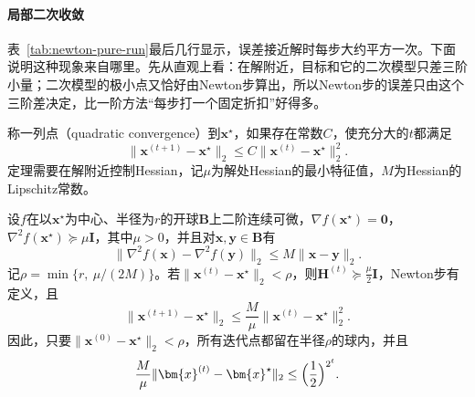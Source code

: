 \paragraph{局部二次收敛}
表~\ref{tab:newton-pure-run}最后几行显示，误差接近解时每步大约平方一次。下面说明这种现象来自哪里。先从直观上看：在解附近，目标和它的二次模型只差三阶小量；二次模型的极小点又恰好由Newton步算出，所以Newton步的误差只由这个三阶差决定，比一阶方法“每步打一个固定折扣”好得多。

称一列点（quadratic convergence）到$\bm{x}^\star$，如果存在常数$C$，使充分大的$t$都满足
\begin{equation}
 \lVert\bm{x}^{(t+1)}-\bm{x}^\star\rVert_2\leq C\lVert\bm{x}^{(t)}-\bm{x}^\star\rVert_2^2.
 \label{eq:newton-quadratic-definition}
\end{equation}
定理需要在解附近控制Hessian，记$\mu$为解处Hessian的最小特征值，$M$为Hessian的Lipschitz常数。

\begin{theorem}[Newton法的局部二次收敛]
\label{thm:newton-local}
设$f$在以$\bm{x}^\star$为中心、半径为$r$的开球$\bm{B}$上二阶连续可微，$\nabla f(\bm{x}^\star)=\bm{0}$，$\nabla^2f(\bm{x}^\star)\succeq\mu\bm{I}$，其中$\mu>0$，并且对$\bm{x},\bm{y}\in\bm{B}$有
\begin{equation}
 \lVert\nabla^2f(\bm{x})-\nabla^2f(\bm{y})\rVert_2\leq M\lVert\bm{x}-\bm{y}\rVert_2.
 \label{eq:newton-hessian-lipschitz}
\end{equation}
记$\rho=\min\{r,\ \mu/(2M)\}$。若$\lVert\bm{x}^{(t)}-\bm{x}^\star\rVert_2<\rho$，则$\bm{H}^{(t)}\succeq\tfrac\mu2\bm{I}$，Newton步有定义，且
\begin{equation}
 \lVert\bm{x}^{(t+1)}-\bm{x}^\star\rVert_2\leq\frac{M}{\mu}\lVert\bm{x}^{(t)}-\bm{x}^\star\rVert_2^2.
 \label{eq:newton-quadratic-bound}
\end{equation}
因此，只要$\lVert\bm{x}^{(0)}-\bm{x}^\star\rVert_2<\rho$，所有迭代点都留在半径$\rho$的球内，并且
\begin{equation}
 \frac{M}{\mu}\lVert\bm{x}^{(t)}-\bm{x}^\star\rVert_2\leq\Bigl(\frac12\Bigr)^{2^t}.
 \label{eq:newton-doubly-exponential}
\end{equation}
\end{theorem}

